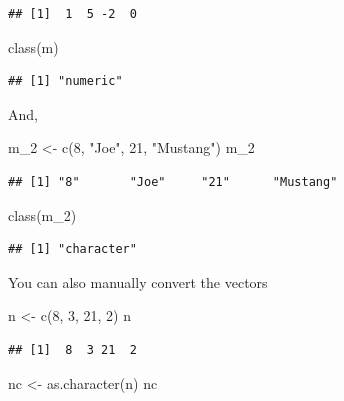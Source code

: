 \documentclass[
]{book}
\newenvironment{Shaded}{\begin{snugshade}}{\end{snugshade}}
\newcommand{\DecValTok}[1]{\textcolor[rgb]{0.00,0.00,0.81}{#1}}
\newcommand{\FunctionTok}[1]{\textcolor[rgb]{0.00,0.00,0.00}{#1}}
\newcommand{\NormalTok}[1]{#1}
\newcommand{\OtherTok}[1]{\textcolor[rgb]{0.56,0.35,0.01}{#1}}
\newcommand{\StringTok}[1]{\textcolor[rgb]{0.31,0.60,0.02}{#1}}
\theoremstyle{definition}
\theoremstyle{definition}
\theoremstyle{definition}
\theoremstyle{definition}
\theoremstyle{remark}
\begin{document}
\begin{verbatim}
## [1]  1  5 -2  0
\end{verbatim}

\begin{Shaded}
\begin{Highlighting}[]
\FunctionTok{class}\NormalTok{(m)}
\end{Highlighting}
\end{Shaded}

\begin{verbatim}
## [1] "numeric"
\end{verbatim}

And,

\begin{Shaded}
\begin{Highlighting}[]
\NormalTok{m\_2 }\OtherTok{\textless{}{-}} \FunctionTok{c}\NormalTok{(}\DecValTok{8}\NormalTok{, }\StringTok{"Joe"}\NormalTok{, }\DecValTok{21}\NormalTok{, }\StringTok{"Mustang"}\NormalTok{)}
\NormalTok{m\_2 }
\end{Highlighting}
\end{Shaded}

\begin{verbatim}
## [1] "8"       "Joe"     "21"      "Mustang"
\end{verbatim}

\begin{Shaded}
\begin{Highlighting}[]
\FunctionTok{class}\NormalTok{(m\_2)}
\end{Highlighting}
\end{Shaded}

\begin{verbatim}
## [1] "character"
\end{verbatim}

You can also manually convert the vectors

\begin{Shaded}
\begin{Highlighting}[]
\NormalTok{n }\OtherTok{\textless{}{-}} \FunctionTok{c}\NormalTok{(}\DecValTok{8}\NormalTok{, }\DecValTok{3}\NormalTok{, }\DecValTok{21}\NormalTok{, }\DecValTok{2}\NormalTok{)}
\NormalTok{n}
\end{Highlighting}
\end{Shaded}

\begin{verbatim}
## [1]  8  3 21  2
\end{verbatim}

\begin{Shaded}
\begin{Highlighting}[]
\NormalTok{nc }\OtherTok{\textless{}{-}} \FunctionTok{as.character}\NormalTok{(n)}
\NormalTok{nc}
\end{Highlighting}
\end{Shaded}
\end{document}
